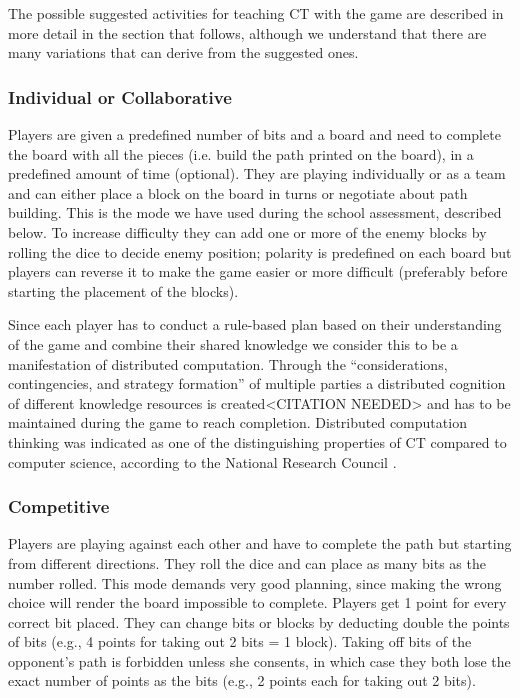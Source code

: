 \documentclass{acm_proc_article-sp}
\begin{document}
The possible suggested activities for teaching CT with the game are described in more detail in the section that follows, although we understand that there are many variations that can derive from the suggested ones.

\subsubsection{Individual or Collaborative}
Players are given a predefined number of bits and a board and need to complete the board with all the pieces (i.e. build the path printed on the board), in a predefined amount of time (optional). They are playing individually or as a team and can either place a block on the board in turns or negotiate about path building. This is the mode we have used during the school assessment, described below. To increase difficulty they can add one or more of the enemy blocks by rolling the dice to decide enemy position; polarity is predefined on each board but players can reverse it to make the game easier or more difficult (preferably before starting the placement of the blocks).

Since each player has to conduct a rule-based plan based on their understanding of the game and combine their shared knowledge we consider this to be a manifestation of distributed computation. Through the ``considerations, contingencies, and strategy formation'' of multiple parties a distributed cognition of different knowledge resources is created<CITATION NEEDED>\cite{} and has to be maintained during the game to reach completion. Distributed computation thinking was indicated as one of the distinguishing properties of CT compared to computer science, according to the National Research Council \cite{national2010report}.

\subsubsection{Competitive}
Players are playing against each other and have to complete the path but starting from different directions. They roll the dice and can place as many bits as the number rolled. This mode demands very good planning, since making the wrong choice will render the board impossible to complete. Players get 1 point for every correct bit placed. They can change bits or blocks by deducting double the points of bits (e.g., 4 points for taking out 2 bits = 1 block). Taking off bits of the opponent's path is forbidden unless she consents, in which case they both lose the exact number of points as the bits (e.g., 2 points each for taking out 2 bits).
\end{document}
